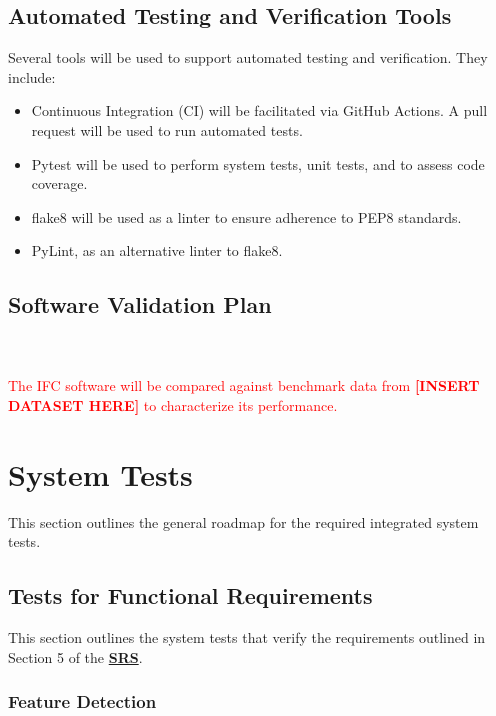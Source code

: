 \documentclass[12pt, titlepage]{article}
\begin{document}
\subsection{Automated Testing and Verification Tools}
Several tools will be used to support automated testing and verification. They include:
\begin{itemize}
\item Continuous Integration (CI) will be facilitated via GitHub Actions. A pull request will be used 
to run automated tests.
\item Pytest will be used to perform system tests, unit tests, and to assess code coverage. 
\item flake8 will be used as a linter to ensure adherence to PEP8 standards. 
\item PyLint, as an alternative linter to flake8.
\end{itemize}
\subsection{Software Validation Plan}
\\ \\

\textcolor{red}{The IFC software will be compared against benchmark data from \textbf{[INSERT DATASET HERE]} 
to characterize its performance.}


\section{System Tests}\label{Sys_Tests}
This section outlines the general roadmap for the required integrated system tests. 
\subsection{Tests for Functional Requirements} \label{FR_Tests}
This section outlines the system tests that verify the requirements outlined in 
Section 5 of the 
\textbf{\href{https://github.com/KiranSingh15/CAS-741-Image-Correspondences/blob/main/docs/SRS/SRS.pdf}
{SRS}}. 

\subsubsection{Feature Detection}
\end{document}
